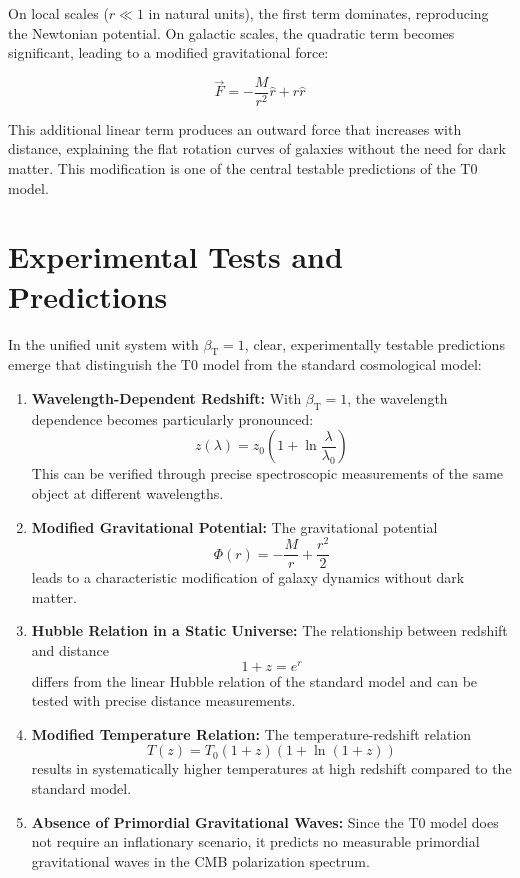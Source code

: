 \documentclass[12pt,a4paper]{article}
\newcommand{\betaT}{\beta_{\text{T}}}
\begin{document}
	On local scales (\(r \ll 1\) in natural units), the first term dominates, reproducing the Newtonian potential. On galactic scales, the quadratic term becomes significant, leading to a modified gravitational force:
	
	\begin{equation}
		\vec{F} = -\frac{M}{r^2} \hat{r} + r \hat{r}
	\end{equation}
	
	This additional linear term produces an outward force that increases with distance, explaining the flat rotation curves of galaxies without the need for dark matter. This modification is one of the central testable predictions of the T0 model.
	
	\section{Experimental Tests and Predictions}
	In the unified unit system with \(\betaT = 1\), clear, experimentally testable predictions emerge that distinguish the T0 model from the standard cosmological model:
	
	\begin{enumerate}
		\item \textbf{Wavelength-Dependent Redshift:} With \(\betaT = 1\), the wavelength dependence becomes particularly pronounced:
		\begin{equation}
			z(\lambda) = z_0 \left(1 + \ln \frac{\lambda}{\lambda_0}\right)
		\end{equation}
		This can be verified through precise spectroscopic measurements of the same object at different wavelengths.
		
		\item \textbf{Modified Gravitational Potential:} The gravitational potential 
		\begin{equation}
			\Phi(r) = -\frac{M}{r} + \frac{r^2}{2}
		\end{equation}
		leads to a characteristic modification of galaxy dynamics without dark matter.
		
		\item \textbf{Hubble Relation in a Static Universe:} The relationship between redshift and distance
		\begin{equation}
			1 + z = e^{r}
		\end{equation}
		differs from the linear Hubble relation of the standard model and can be tested with precise distance measurements.
		
		\item \textbf{Modified Temperature Relation:} The temperature-redshift relation
		\begin{equation}
			T(z) = T_0 (1+z)(1 + \ln(1+z))
		\end{equation}
		results in systematically higher temperatures at high redshift compared to the standard model.
		
		\item \textbf{Absence of Primordial Gravitational Waves:} Since the T0 model does not require an inflationary scenario, it predicts no measurable primordial gravitational waves in the CMB polarization spectrum.
	\end{enumerate}
	
\end{document}
